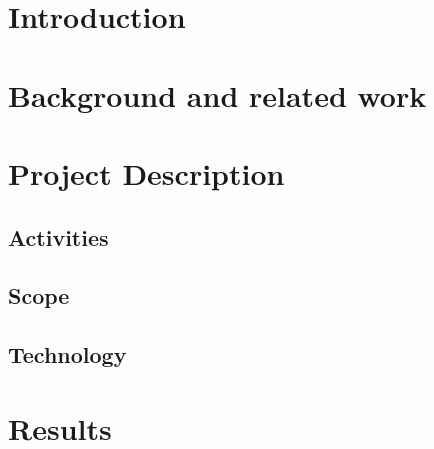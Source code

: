 \documentclass[12pt]{article}
\begin{document}
\section{Introduction}\label{sec:intro}

\section{Background and related work}\label{sec:related}

\section{Project Description}\label{sec:project}

\subsection{Activities}\label{sec:activities}

\subsection{Scope}\label{sec:scope}

\subsection{Technology}\label{sec:technology}

\section{Results}\label{sec:results}



\noindent
\nocite{*}



\end{document}

